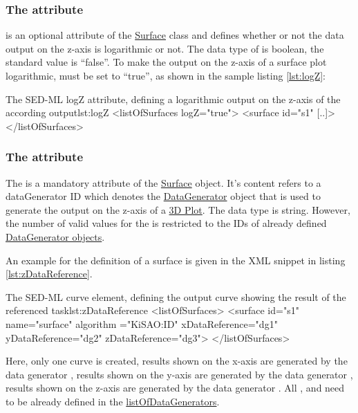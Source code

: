 \subsubsection{The  attribute}
\label{sec:logZ}
 is an optional attribute of the \hyperref[class:surface]{Surface} class and defines whether or not the data output on the z-axis is logarithmic or not. The data type of  is boolean, the standard value is ``false''.
To make the output on the z-axis of a surface plot logarithmic,  must be set to ``true'', as shown in the sample listing \ref{lst:logZ}: 
\begin{myXmlLst}{The SED-ML  logZ attribute, defining a logarithmic output on the z-axis of the according output}{lst:logZ}
<listOfSurfaces logZ="true">
  <surface id="s1" [..]>
</listOfSurfaces>
\end{myXmlLst}

\subsubsection{The  attribute}
\label{sec:zDataReference}
The  is a mandatory attribute of the \hyperref[class:surface]{Surface} object. It's content refers to a dataGenerator ID which denotes the \hyperref[class:dataGenerator]{DataGenerator} object that is used to generate the output on the z-axis of a \hyperref[class:3DPlot]{3D Plot}.
The  data type is string. However, the number of valid values for the  is restricted to the IDs of already defined \hyperref[class:dataGenerator]{DataGenerator objects}.

An example for the definition of a surface is given in the XML snippet in listing \ref{lst:zDataReference}.
%
\begin{myXmlLst}{The SED-ML curve element, defining the output curve showing the result of the referenced task}{lst:zDataReference}
<listOfSurfaces>
  <surface id="s1" name="surface" algorithm ="KiSAO:ID" xDataReference="dg1" 
   yDataReference="dg2" zDataReference="dg3">
</listOfSurfaces>
\end{myXmlLst}
Here, only one curve is created, results shown on the x-axis are generated by the data generator , results shown on the y-axis are generated by the data generator , results shown on the z-axis are generated by the data generator . All ,  and  need to be already defined in the \hyperref[sec:listOfDataGenerators]{listOfDataGenerators}.
